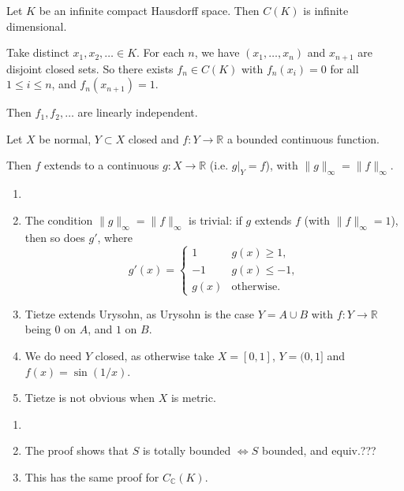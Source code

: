 \documentclass[12pt]{article}
\begin{document}
\begin{corollary}
	Let $K$ be an infinite compact Hausdorff space. Then $C(K)$ is infinite dimensional.
\end{corollary}

\begin{proofbox}
	Take distinct $x_1, x_2, \ldots \in K$. For each $n$, we have $(x_1, \ldots, x_{n})$ and $x_{n+1}$ are disjoint closed sets. So there exists $f_n \in C(K)$ with $f_n(x_i) = 0$ for all $1 \leq i \leq n$, and $f_n(x_{n+1}) = 1$. 

	Then $f_1, f_2, \ldots$ are linearly independent.
\end{proofbox}

\begin{theorem}
	Let $X$ be normal, $Y \subset X$ closed and $f : Y \to \mathbb{R}$ a bounded continuous function.

	Then $f$ extends to a continuous $g : X \to \mathbb{R}$ (i.e. $g|_Y = f$), with $\|g\|_{\infty} = \|f\|_{\infty}$.
\end{theorem}

\begin{remark}
	\begin{enumerate}
		\item[]
		\item The condition $\|g\|_{\infty} = \|f\|_{\infty}$ is trivial: if $g$ extends $f$ (with $\|f\|_{\infty} = 1$), then so does $g'$, where
			\[
			g'(x) =
			\begin{cases}
				1 & g(x) \geq 1,\\
				-1 & g(x) \leq -1,\\
				g(x) &\text{otherwise}.
			\end{cases}
			\]
		\item Tietze extends Urysohn, as Urysohn is the case $Y = A \cup B$ with $f : Y \to \mathbb{R}$ being $0$ on $A$, and $1$ on $B$.
		\item We do need $Y$ closed, as otherwise take $X = [0,1]$, $Y = (0, 1]$ and $f(x) = \sin(1/x)$.
		\item Tietze is not obvious when $X$ is metric.
	\end{enumerate}
	
\end{remark}



\begin{remark}
	\begin{enumerate}
		\item[]
		\item The proof shows that $S$ is totally bounded $\iff S$ bounded, and equiv.???
		\item This has the same proof for $C_{\mathbb{C}}(K)$.
	\end{enumerate}
\end{remark}
\end{document}
